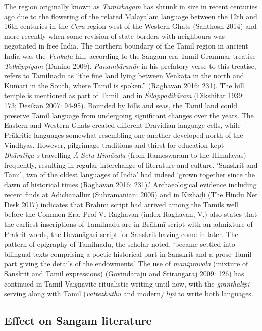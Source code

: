 \item The region originally known as \textit{Tamizhagam} has shrunk in size in recent centuries ago due to the flowering of the related Malayalam language between the 12th and 16th centuries in the \textit{Cera} region west of the Western Ghats (Santhosh 2014) and more recently when some revision of state borders with neighbours was negotiated in free India. The northern boundary of the Tamil region in ancient India was the \textit{Venkaṭa} hill, according to the Sangam era Tamil Grammar treatise \textit{Tolkāppiyam} (Danino 2009). \textit{Panambāranār} in his prefatory verse to this treatise, refers to Tamilnadu as “the fine land lying between Venkaṭa in the north and Kumari in the South, where Tamil is spoken.” (Raghavan 2016: 231). The hill temple is mentioned as part of Tamil land in \textit{Śilappadikāram} (Dikshitar 1939: 173; Desikan 2007: 94-95). Bounded by hills and seas, the Tamil land could preserve Tamil language from undergoing significant changes over the years. The Eastern and Western Ghats created different Dravidian language cells, while Prākritic languages somewhat resembling one another developed north of the Vindhyas. However, pilgrimage traditions and thirst for education kept \textit{Bhāratīya-s} travelling \textit{Ā-Setu-Himācala} (from Rameswaram to the Himalayas) frequently, resulting in regular interchange of literature and culture. ‘Sanskrit and Tamil, two of the oldest languages of India’ had indeed ‘grown together since the dawn of historical times (Raghavan 2016: 231).’ Archaeological evidence including recent finds at Adichanallur (Subramanian: 2005) and in Kizhaḍi (The Hindu Net Desk 2017) indicates that Brāhmī script had arrived among the Tamils well before the Common Era. Prof V. Raghavan (index Raghavan, V.) also states that the earliest inscriptions of Tamilnadu are in Brāhmī script with an admixture of Prakrit words, the Devanāgari script for Sanskrit having come in later. The pattern of epigraphy of Tamilnadu, the scholar noted, ‘became settled into bilingual texts comprising a poetic historical part in Sanskrit and a prose Tamil part giving the details of the endowments.’ The use of \textit{maṇipravāla} (mixture of Sanskrit and Tamil expressions) (Govindaraju and Srirangaraj 2009: 126) has continued in Tamil Vaiṣṇavite ritualistic writing until now, with the \textit{granthalipi} serving along with Tamil (\textit{vattezhuthu} and modern\textit{) lipi} to write both languages.



\subsection{Effect on Sangam literature}

